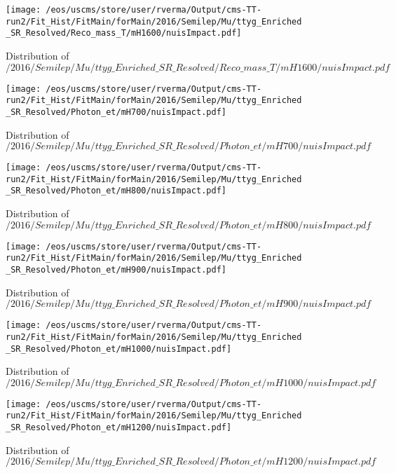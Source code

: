 \begin{figure}
\centering
\texttt{[image: /eos/uscms/store/user/rverma/Output/cms-TT-run2/Fit\_Hist/FitMain/forMain/2016/Semilep/Mu/ttyg\_Enriched\_SR\_Resolved/Reco\_mass\_T/mH1600/nuisImpact.pdf]}
\caption{Distribution of $/2016/Semilep/Mu/ttyg\_Enriched\_SR\_Resolved/Reco\_mass\_T/mH1600/nuisImpact.pdf$}
\end{figure}

\begin{figure}
\centering
\texttt{[image: /eos/uscms/store/user/rverma/Output/cms-TT-run2/Fit\_Hist/FitMain/forMain/2016/Semilep/Mu/ttyg\_Enriched\_SR\_Resolved/Photon\_et/mH700/nuisImpact.pdf]}
\caption{Distribution of $/2016/Semilep/Mu/ttyg\_Enriched\_SR\_Resolved/Photon\_et/mH700/nuisImpact.pdf$}
\end{figure}

\begin{figure}
\centering
\texttt{[image: /eos/uscms/store/user/rverma/Output/cms-TT-run2/Fit\_Hist/FitMain/forMain/2016/Semilep/Mu/ttyg\_Enriched\_SR\_Resolved/Photon\_et/mH800/nuisImpact.pdf]}
\caption{Distribution of $/2016/Semilep/Mu/ttyg\_Enriched\_SR\_Resolved/Photon\_et/mH800/nuisImpact.pdf$}
\end{figure}

\begin{figure}
\centering
\texttt{[image: /eos/uscms/store/user/rverma/Output/cms-TT-run2/Fit\_Hist/FitMain/forMain/2016/Semilep/Mu/ttyg\_Enriched\_SR\_Resolved/Photon\_et/mH900/nuisImpact.pdf]}
\caption{Distribution of $/2016/Semilep/Mu/ttyg\_Enriched\_SR\_Resolved/Photon\_et/mH900/nuisImpact.pdf$}
\end{figure}

\begin{figure}
\centering
\texttt{[image: /eos/uscms/store/user/rverma/Output/cms-TT-run2/Fit\_Hist/FitMain/forMain/2016/Semilep/Mu/ttyg\_Enriched\_SR\_Resolved/Photon\_et/mH1000/nuisImpact.pdf]}
\caption{Distribution of $/2016/Semilep/Mu/ttyg\_Enriched\_SR\_Resolved/Photon\_et/mH1000/nuisImpact.pdf$}
\end{figure}

\begin{figure}
\centering
\texttt{[image: /eos/uscms/store/user/rverma/Output/cms-TT-run2/Fit\_Hist/FitMain/forMain/2016/Semilep/Mu/ttyg\_Enriched\_SR\_Resolved/Photon\_et/mH1200/nuisImpact.pdf]}
\caption{Distribution of $/2016/Semilep/Mu/ttyg\_Enriched\_SR\_Resolved/Photon\_et/mH1200/nuisImpact.pdf$}
\end{figure}


